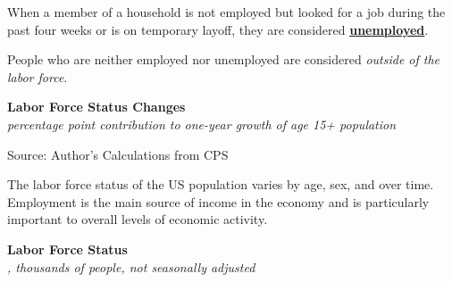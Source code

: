 \documentclass{report}
\makeatletter
\newcommand{\tbllink}[1]{\href{https://raw.githubusercontent.com/bdecon/US-chartbook/master/chartbook/data/#1}{\faTable}}
\newcommand*\short[1]{\expandafter\@gobbletwo\number\numexpr#1\relax}
\newcommand{\ctsbar}[5]{
		\addplot[ybar stacked, bar width=#5, draw opacity=0, fill=#1] 
			table [x=#2, y=#3, col sep=comma]{#4};}
\newcommand{\dateaxisticks}{
		date coordinates in=x, axis line style={draw=none},
		xmax={2023-11-30},
		max space between ticks=40,	    
		xtick={{1990-01-01}, {1992-01-01}, {1994-01-01}, 
			{1996-01-01}, {1998-01-01}, {2000-01-01}, 
			{2002-01-01}, {2004-01-01}, {2006-01-01},
			{2008-01-01}, {2010-01-01}, {2012-01-01}, {2014-01-01},
		    {2016-01-01}, {2018-01-01}, {2020-01-01}, {2022-01-01}, 
		    {2024-01-01}, {2026-01-01}},
		minor xtick={{1989-01-01}, {1991-01-01}, {1993-01-01},
			{1995-01-01}, {1997-01-01}, {1999-01-01}, 
			{2001-01-01}, {2003-01-01}, {2005-01-01}, {2007-01-01},
		    {2009-01-01}, {2011-01-01}, {2013-01-01}, {2015-01-01},
		    {2017-01-01}, {2019-01-01}, {2021-01-01}, {2023-01-01}, 
		    {2025-01-01}, {2027-01-01}},
		enlarge y limits={0.06}, enlarge x limits={0.01},
		xticklabel style={align=center, yshift=-2pt}, tick label style={inner sep=0pt},
		}
\newcommand{\bbar}[2]{extra #1 ticks = {{#2}}, extra #1 tick labels = ,
		extra #1 tick style = {grid=major, grid style={thick, black!25}},}
\newcommand{\rbars}{
		\fill[color=black!10] (axis cs:{1990-07-01},\pgfkeysvalueof{/pgfplots/ymin}) rectangle 
			(axis cs:{1991-03-01}, \pgfkeysvalueof{/pgfplots/ymax});
		\fill[color=black!10] (axis cs:{2007-12-01},\pgfkeysvalueof{/pgfplots/ymin}) rectangle 
			(axis cs:{2009-07-01}, \pgfkeysvalueof{/pgfplots/ymax});
		\fill[color=black!10] (axis cs:{2001-03-01},\pgfkeysvalueof{/pgfplots/ymin}) rectangle 
			(axis cs:{2001-11-01}, \pgfkeysvalueof{/pgfplots/ymax});
		\fill[color=black!10] (axis cs:{2020-02-01},\pgfkeysvalueof{/pgfplots/ymin}) rectangle 
			(axis cs:{2020-05-01}, \pgfkeysvalueof{/pgfplots/ymax});}
\makeatother
\begin{document}
{\begin{minipage}{0.76\textwidth}
\small When a member of a household is not employed but looked for a job during the past four weeks or is on temporary layoff, they are considered \href{https://www.bls.gov/cps/cps_htgm.htm}{\textbf{unemployed}}. 

People who are neither employed nor unemployed are considered \textit{outside of the labor force}.  
\vspace{1mm}

\normalsize \textbf{Labor Force Status Changes}\\
\footnotesize{\textit{percentage point contribution to one-year growth of age 15+ population}}
\vspace{5.4cm}

\hspace{2mm} 

\footnotesize{Source: Author's Calculations from CPS} \hfill \tbllink{cps_lfs2.csv}
\end{minipage}
\newpage
{}
\begin{minipage}{0.76\textwidth} 
\small The labor force status of the US population varies by age, sex, and over time. Employment is the main source of income in the economy and is particularly important to overall levels of economic activity. 
\vspace{1mm}

\normalsize \textbf{Labor Force Status}\\
\footnotesize{\textit{\unskip, thousands of people, not seasonally adjusted}}\\
\noindent {} \setlength{\tabcolsep}{3.0pt} \color{black!90}
		{\renewcommand{\arraystretch}{1.5}
		 \begin{tabular}{p{27.8mm} R{11.2mm} R{10.4mm} R{10.4mm} R{10.2mm} 
		 				 R{10.6mm} R{10.4mm} R{10.4mm}}
			  \hline
		\end{tabular}}
\vspace{-3mm}	
	

\end{minipage}}
\end{document}
